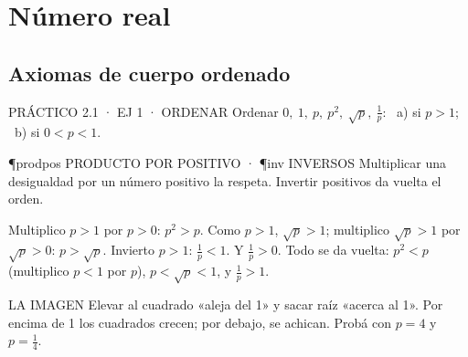 \chapter{Número real}

\section{Axiomas de cuerpo ordenado}

\begin{enunciado}{PRÁCTICO 2.1 · EJ 1 · ORDENAR}
Ordenar $0,\ 1,\ p,\ p^2,\ \sqrt p,\ \frac1p$: \ a) si $p>1$; \ b) si $0<p<1$.
\end{enunciado}
\begin{uso}{\P{prodpos} PRODUCTO POR POSITIVO · \P{inv} INVERSOS}
Multiplicar una desigualdad por un número positivo la respeta. Invertir positivos da vuelta el orden.
\end{uso}
Multiplico $p>1$ por $p>0$: $p^2>p$. Como $p>1$, $\sqrt p>1$; multiplico $\sqrt p>1$ por $\sqrt p>0$: $p>\sqrt p$. Invierto $p>1$: $\frac1p<1$. Y $\frac1p>0$.
Todo se da vuelta: $p^2<p$ (multiplico $p<1$ por $p$), $p<\sqrt p<1$, y $\frac1p>1$.
\begin{tip}{LA IMAGEN}
Elevar al cuadrado «aleja del 1» y sacar raíz «acerca al 1». Por encima de 1 los cuadrados crecen; por debajo, se achican. Probá con $p=4$ y $p=\frac14$.
\end{tip}

